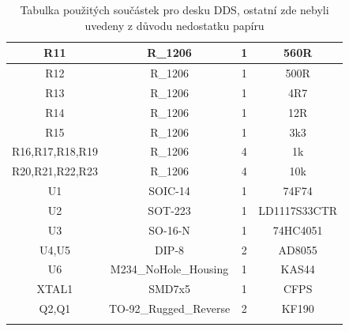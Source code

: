 \begin{table}[H]
\begin{center}
\begin{tabular}[H]{!{\vrule width 1pt}c|c|c|c!{\vrule width 1pt}}
			R11	&	R\_1206	&	1	&	560R	\\\hline
			R12	&	R\_1206	&	1	&	500R	\\\hline
			R13	&	R\_1206	&	1	&	4R7	\\\hline
			R14	&	R\_1206	&	1	&	12R	\\\hline
			R15	&	R\_1206	&	1	&	3k3	\\\hline
			R16,R17,R18,R19	&	R\_1206	&	4	&	1k	\\\hline
			R20,R21,R22,R23	&	R\_1206	&	4	&	10k	\\\hline
			U1	&	SOIC-14	&	1	&	74F74	\\\hline
			U2	&	SOT-223	&	1	&	LD1117S33CTR	\\\hline
			U3	&	SO-16-N	&	1	&	74HC4051	\\\hline
			U4,U5	&	DIP-8	&	2	&	AD8055	\\\hline
			U6	&	M234\_NoHole\_Housing	&	1	&	KAS44	\\\hline
			XTAL1	&	SMD7x5	&	1	&	CFPS	\\\hline
			Q2,Q1	&	TO-92\_Rugged\_Reverse	&	2	&	KF190 \\\specialrule{1pt}{0pt}{0pt} 
		\end{tabular}

		\caption{Tabulka použitých součástek pro desku DDS, ostatní zde nebyli uvedeny z důvodu nedostatku papíru}
		\label{tab:s1}      
	\end{center}
\end{table}

